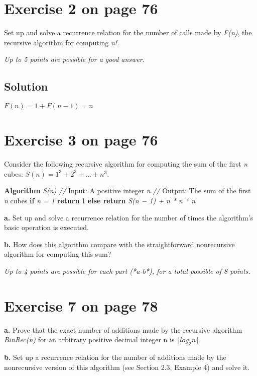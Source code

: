 \documentclass[11pt]{article}
\begin{document}
\section*{Exercise 2 on page 76}
\label{sec-7}


Set up and solve a recurrence relation for the number of calls made by \emph{F(n)},
the recursive algorithm for computing \emph{n!}.

\emph{Up to 5 points are possible for a good answer.}

\subsection*{Solution}
\label{sec-7.1}

\(F\left(n\right)=1+F\left(n-1\right)=n\)

\section*{Exercise 3 on page 76}
\label{sec-8}


Consider the following recursive algorithm for computing the sum of the first
\emph{n} cubes: \(S(n) = 1^3 + 2^3 + ... + n^3.\)

\textbf{Algorithm} \emph{S(n)}
  \emph{//} Input: A positive integer \emph{n}
  \emph{//} Output: The sum of the first \emph{n} cubes
  \textbf{if} \emph{n = 1} \textbf{return} 1
  \textbf{else return} \emph{S(n − 1) + n * n * n}

\textbf{a.} Set up and solve a recurrence relation for the number of times the algorithm's
   basic operation is executed.

\textbf{b.} How does this algorithm compare with the straightforward nonrecursive
   algorithm for computing this sum?

\emph{Up to 4 points are possible for each part (*a-b*), for a total possible of 8 points.}

\section*{Exercise 7 on page 78}
\label{sec-9}


\textbf{a.} Prove that the exact number of additions made by the recursive algorithm
   \emph{BinRec(n)} for an arbitrary positive decimal integer n is \(\lfloor log_2 n \rfloor\).

\textbf{b.} Set up a recurrence relation for the number of additions made by the
   nonrecursive version of this algorithm (see Section 2.3, Example 4) and
   solve it.
\end{document}
